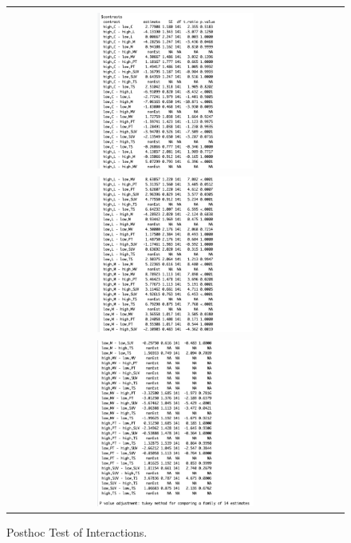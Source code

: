 \documentclass[acmsmall]{acmart}
\begin{document}
\begin{figure}[H] %
	\centering
	\begin{tabular}{p{}}
	\hline
	\multicolumn{1}{|c|}{}\\
		\multicolumn{1}{|c|}{\includegraphics[width=0.48\textwidth]{../graphics/TWAcon1}}\\
		\multicolumn{1}{|c|}{\includegraphics[width=0.48\textwidth]{../graphics/TWAcon2}}\\
		\multicolumn{1}{|c|}{\includegraphics[width=0.48\textwidth]{../graphics/TWAcon3}}\\
		
		\hline
	\end{tabular}		
	\caption{Posthoc Test of Interactions.} %
	\label{fig:PHT}
\end{figure}
\end{document}
